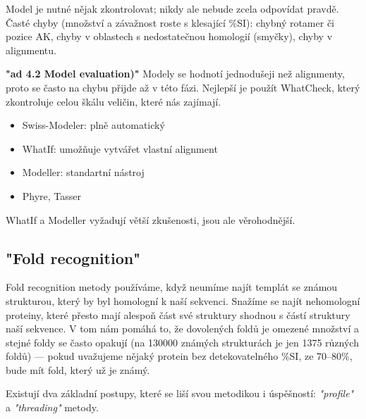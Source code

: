 \documentclass[DIV=8]{scrreprt}
\begin{document}
Model je nutné nějak zkontrolovat; nikdy ale nebude zcela odpovídat pravdě. Časté chyby (množství a závažnost roste s klesající \%SI):  chybný rotamer či pozice AK, chyby v oblastech s nedostatečnou homologií (smyčky), chyby v alignmentu.

\textbf{"ad 4.2 Model evaluation)"} Modely se hodnotí jednodušeji než alignmenty, proto se často na chybu přijde až v této fázi. Nejlepší je použít WhatCheck, který zkontroluje celou škálu veličin, které nás zajímají.

\begin{itemize}
    \item Swiss-Modeler: plně automatický
    \item WhatIf: umožňuje vytvářet vlastní alignment
    \item Modeller: standartní nástroj
    \item Phyre, Tasser
\end{itemize}


WhatIf a Modeller vyžadují větší zkušenosti, jsou ale věrohodnější.

\subsection{"Fold recognition"}

Fold recognition metody používáme, když neumíme najít templát se známou strukturou, který by byl homologní k naší sekvenci. Snažíme se najít nehomologní proteiny, které přesto mají alespoň část své struktury shodnou s částí struktury naší sekvence. V tom nám pomáhá to, že dovolených foldů je omezené množství a stejné foldy se často opakují (na 130000 známých strukturách je jen 1375 různých foldů) --- pokud uvažujeme nějaký protein bez detekovatelného \%SI, ze 70--80\%, bude mít fold, který už je známý.

Existují dva základní postupy, které se liší svou metodikou i úspěšností: \emph{"profile"} a \emph{"threading"} metody.
\end{document}
